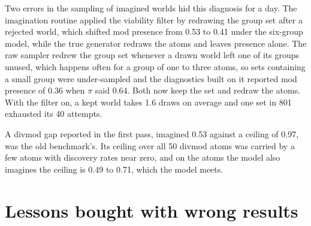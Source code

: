 \documentclass[11pt]{article}
\begin{document}
Two errors in the sampling of imagined worlds hid this diagnosis for a day. The imagination routine applied the viability filter by redrawing the group set after a rejected world, which shifted mod presence from 0.53 to 0.41 under the six-group model, while the true generator redraws the atoms and leaves presence alone. The raw sampler redrew the group set whenever a drawn world left one of its groups unused, which happens often for a group of one to three atoms, so sets containing a small group were under-sampled and the diagnostics built on it reported mod presence of 0.36 when $\pi$ said 0.64. Both now keep the set and redraw the atoms. With the filter on, a kept world takes 1.6 draws on average and one set in 801 exhausted its 40 attempts.

A divmod gap reported in the first pass, imagined 0.53 against a ceiling of 0.97, was the old benchmark's. Its ceiling over all 50 divmod atoms was carried by a few atoms with discovery rates near zero, and on the atoms the model also imagines the ceiling is 0.49 to 0.71, which the model meets.

\section{Lessons bought with wrong results}
\end{document}
